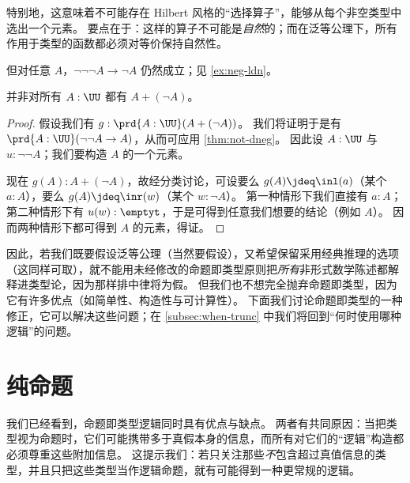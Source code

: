 \begin{rmk}
  特别地，这意味着不可能存在 Hilbert 风格的“选择算子”，能够从每个非空类型中选出一个元素。
  要点在于：这样的算子不可能是\emph{自然}的；而在泛等公理下，所有作用于类型的函数都必须对等价保持自然性。
\end{rmk}

\begin{rmk}
  但对任意 $A$，$\neg\neg\neg A \to \neg A$ 仍然成立；见 \cref{ex:neg-ldn}。
\end{rmk}

\begin{cor}\label{thm:not-lem}
  并非对所有 $A:\UU$ 都有 $A+(\neg A)$。
\end{cor}
\begin{proof}
  假设我们有 $g:\prd{A:\UU} (A+(\neg A))$。
  我们将证明于是有 $\prd{A:\UU} (\neg\neg A \to A)$，从而可应用 \cref{thm:not-dneg}。
  因此设 $A:\UU$ 与 $u:\neg\neg A$；我们要构造 $A$ 的一个元素。

  现在 $g(A):A+(\neg A)$，故经分类讨论，可设要么 $g(A)\jdeq \inl(a)$（某个 $a:A$），要么 $g(A)\jdeq \inr(w)$（某个 $w:\neg A$）。
  第一种情形下我们直接有 $a:A$；第二种情形下有 $u(w):\emptyt$，于是可得到任意我们想要的结论（例如 $A$）。
  因而两种情形下都可得到 $A$ 的元素，得证。
\end{proof}

因此，若我们既要假设泛等公理（当然要假设），又希望保留采用经典推理的选项（这同样可取），就不能用未经修改的命题即类型原则把\emph{所有}非形式数学陈述都解释进类型论，因为那样排中律将为假。
但我们也不想完全抛弃命题即类型，因为它有许多优点（如简单性、构造性与可计算性）。
下面我们讨论命题即类型的一种修正，它可以解决这些问题；在 \cref{subsec:when-trunc} 中我们将回到“何时使用哪种逻辑”的问题。
%
%
%
\section{纯命题}
\label{subsec:hprops}

%
%
%
我们已经看到，命题即类型逻辑同时具有优点与缺点。
两者有共同原因：当把类型视为命题时，它们可能携带多于真假本身的信息，而所有对它们的“逻辑”构造都必须尊重这些附加信息。
这提示我们：若只关注那些\emph{不}包含超过真值信息的类型，并且只把这些类型当作逻辑命题，就有可能得到一种更常规的逻辑。

